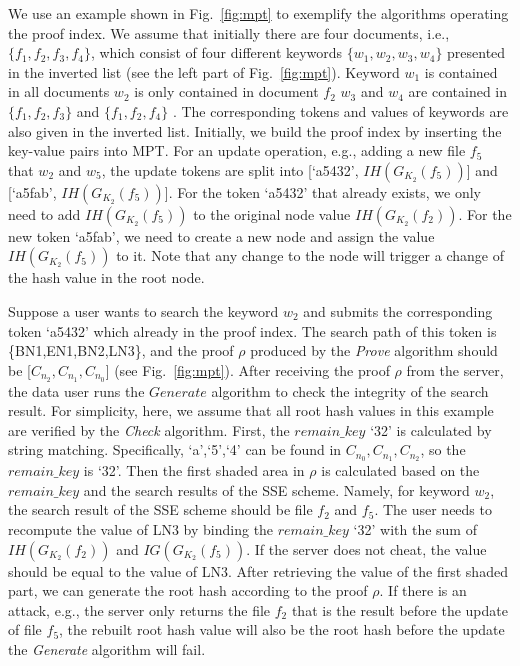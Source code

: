 We use an example shown in Fig.~\ref{fig:mpt} to exemplify the algorithms operating the proof index. We assume that initially there are four documents, i.e., $\{f_1, f_2, f_3, f_4\}$, which consist of four different keywords $\{w_1, w_2, w_3, w_4\}$ presented in the inverted list (see the left part of Fig.~\ref{fig:mpt}). Keyword $w_1$ is contained in all documents $w_2$ is only contained in document $f_2$ $w_3$ and $w_4$ are contained in $\{f_1, f_2, f_3\}$ and $\{f_1, f_2, f_4\}$ . The corresponding tokens and values of keywords are also given in the inverted list. Initially, we build the proof index by inserting the key-value pairs into MPT. For an update operation, e.g., adding a new file $f_5$ that  $w_2$ and $w_5$, the update tokens are split into [`a5432', $IH(G_{K_2} (f_5))$] and [`a5fab', $IH(G_{K_2} (f_5))$]. For the token `a5432' that already exists, we only need to add $IH(G_{K_2} (f_5))$ to the original node value $IH(G_{K_2} (f_2))$. For the new token `a5fab', we need to create a new node and assign the value $IH(G_{K_2} (f_5))$ to it. Note that any change to the node will trigger a change of the hash value in the root node.

Suppose a user wants to search the keyword $w_2$ and submits the corresponding token `a5432' which already  in the proof index. The search path of this token is \{BN1,EN1,BN2,LN3\}, and the proof $\rho$ produced by the {\it Prove} algorithm should be [$C_{n_2}, C_{n_1}, C_{n_0}$] (see Fig.~\ref{fig:mpt}). After receiving the proof $\rho$ from the server, the data user runs the $Generate$ algorithm to check the integrity of the search result. For simplicity, here, we assume that all root hash values in this example are verified by the {\it Check} algorithm. First, the $remain\_key$ `32' is calculated by string matching. Specifically, `a',`5',`4' can be found in $C_{n_0}, C_{n_1}, C_{n_2}$, so the $remain\_key$ is `32'. Then the first shaded area in $\rho$ is calculated based on the $remain\_key$ and the search results of the SSE scheme. Namely, for keyword $w_2$, the search result of the SSE scheme should be file $f_2$ and $f_5$. The user needs to recompute the value of LN3 by binding the $remain\_key$ `32' with the sum of $IH(G_{K_2} (f_2))$ and $IG(G_{K_2} (f_5))$. If the server does not cheat, the value should be equal to the value of LN3. After retrieving the value of the first shaded part, we can generate the root hash according to the proof $\rho$. {If there is an attack, e.g., the server only returns the file $f_2$ that is the result before the update of file $f_5$, the rebuilt root hash value will also be the root hash before the update the {\it Generate} algorithm will fail.}

